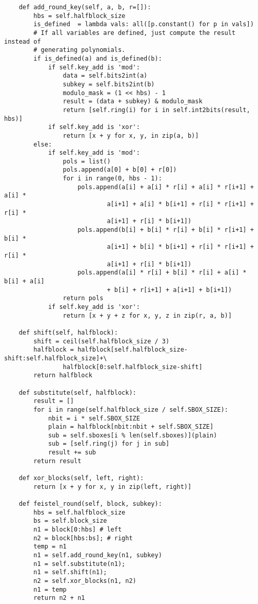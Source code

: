 \begin{lstlisting}
    def add_round_key(self, a, b, r=[]):
        hbs = self.halfblock_size
        is_defined  = lambda vals: all([p.constant() for p in vals])
        # If all variables are defined, just compute the result instead of
        # generating polynomials.
        if is_defined(a) and is_defined(b):
            if self.key_add is 'mod':
                data = self.bits2int(a)
                subkey = self.bits2int(b)
                modulo_mask = (1 << hbs) - 1
                result = (data + subkey) & modulo_mask
                return [self.ring(i) for i in self.int2bits(result, hbs)]
            if self.key_add is 'xor':
                return [x + y for x, y, in zip(a, b)]
        else:
            if self.key_add is 'mod':
                pols = list()
                pols.append(a[0] + b[0] + r[0])
                for i in range(0, hbs - 1):
                    pols.append(a[i] + a[i] * r[i] + a[i] * r[i+1] + a[i] *
                            a[i+1] + a[i] * b[i+1] + r[i] * r[i+1] + r[i] *
                            a[i+1] + r[i] * b[i+1])
                    pols.append(b[i] + b[i] * r[i] + b[i] * r[i+1] + b[i] *
                            a[i+1] + b[i] * b[i+1] + r[i] * r[i+1] + r[i] *
                            a[i+1] + r[i] * b[i+1])
                    pols.append(a[i] * r[i] + b[i] * r[i] + a[i] * b[i] + a[i]
                            + b[i] + r[i+1] + a[i+1] + b[i+1])
                return pols
            if self.key_add is 'xor':
                return [x + y + z for x, y, z in zip(r, a, b)]

    def shift(self, halfblock):
        shift = ceil(self.halfblock_size / 3)
        halfblock = halfblock[self.halfblock_size-shift:self.halfblock_size]+\
                halfblock[0:self.halfblock_size-shift]
        return halfblock

    def substitute(self, halfblock):
        result = []
        for i in range(self.halfblock_size / self.SBOX_SIZE):
            nbit = i * self.SBOX_SIZE
            plain = halfblock[nbit:nbit + self.SBOX_SIZE]
            sub = self.sboxes[i % len(self.sboxes)](plain)
            sub = [self.ring(j) for j in sub]
            result += sub
        return result

    def xor_blocks(self, left, right):
        return [x + y for x, y in zip(left, right)]

    def feistel_round(self, block, subkey):
        hbs = self.halfblock_size
        bs = self.block_size
        n1 = block[0:hbs] # left
        n2 = block[hbs:bs]; # right
        temp = n1
        n1 = self.add_round_key(n1, subkey)
        n1 = self.substitute(n1);
        n1 = self.shift(n1);
        n2 = self.xor_blocks(n1, n2)
        n1 = temp
        return n2 + n1


\end{lstlisting}
